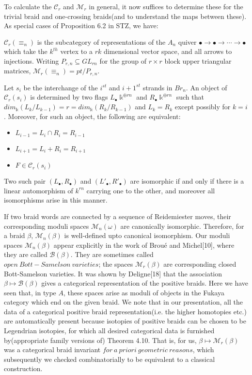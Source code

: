 To calculate the $\mathcal{C}_r$ and $\mathcal{M}_r$ in general, it now suffices to determine these for the trivial braid and one-crossing braids(and to understand the maps between these). As special cases of Proposition 6.2 in STZ, we have:
\begin{corollary}
	$\mathcal{C}_r(\equiv_n)$ is the subcategory of representations of the $A_n$ quiver $\bullet\rightarrow\bullet\rightarrow\cdots\rightarrow\bullet$ which take the $k^{th}$ vertex to a $rk$ dimensional vector space, and all arrows to injections. Writing $P_{r,n}\subseteq GL_{rn}$ for the group of $r\times r$ block upper triangular matrices, $\mathcal{M}_r(\equiv_n)=pt/P_{r,n}$.
\end{corollary}
\begin{corollary}
	Let $s_i$ be the interchange of the $i^{st}$ and $i+1^{st}$ strands in $Br_n$. An object of $\mathcal{C}_r(s_i)$ is determined by two flags $L_{\bullet}\Bbbk^{\oplus rn}$ and $R_{\bullet}\Bbbk^{\oplus rn}$ such that $dim_\Bbbk(L_k/L_{k-1})=r=dim_\Bbbk(R_k/R_{k-1})$ and $L_k = R_k$ except possibly for $k=i$. Moreover, for such an object, the following are equivalent:
	\begin{itemize}
		\item $L_{i-1}=L_i\cap R_i=R_{i-1}$
		\item $L_{i+1}=L_i + R_i=R_{i+1}$
		\item $F\in \mathcal{C}_r(s_i)$
	\end{itemize}
\end{corollary}
Two such pair $(L_{\bullet},R_{\bullet})$ and $(L'_{\bullet},R'_{\bullet})$ are isomorphic if and only if there is a linear automorphism of $k^{rn}$ carrying one to the other, and moreover all isomorphisms arise in this manner.
\begin{remark}
	If two braid words are connected by a sequence of Reidemiester moves, their corresponding moduli spaces $\mathcal{M}_n(\omega)$ are canonically isomorphic. Therefore, for a braid $\beta$, $\mathcal{M}_n(\beta)$ is well-defined upto canonical isomorphism. Our moduli spaces $\mathcal{M}_n(\beta)$ appear explicitly in the work of Brou\'{e} and Michel[10], where they are called $\mathcal{B}(\beta)$. They are sometimes called $open~ Bott-Samelson~ varieties$; the spaces $\mathcal{M}_r(\beta)$ are corresponding closed Bott-Samelson varieties. It was shown by Deligne[18] that the association $\beta\mapsto \mathcal{B}(\beta)$ gives a categorical representation of the positive braids.
	Here we have seen that, in type $A$, these spaces arise as moduli of objects in the Fukaya category which end on the given braid. We note that in our presentation, all the data of a categorical positive braid representation(i.e. the higher homotopies etc.) are automatically present because isotopies of positive braids can be chosen to be Legendrian isotopies, for which all desired categorical data is furnished by(appropriate family versions of) Theorem 4.10. That is, for us, $\beta\mapsto \mathcal{M}_r(\beta)$ was a categorical braid invariant $for~a~priori~geometric~ reasons$, which subsequently we checked combinatorially to be equivalent to a classical construction.
\end{remark}
